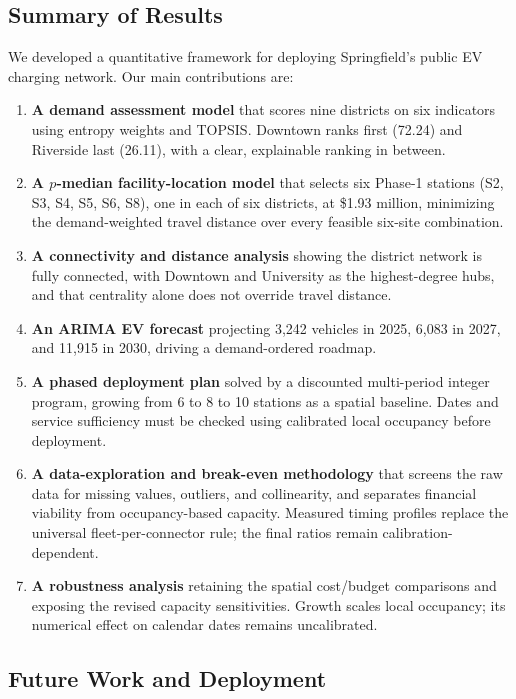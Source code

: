 \documentclass[12pt]{article}
\begin{document}
\subsection{Summary of Results}

We developed a quantitative framework for deploying Springfield's public EV charging
network. Our main contributions are:

\begin{enumerate}
    \item \textbf{A demand assessment model} that scores nine districts on six indicators
    using entropy weights and TOPSIS. Downtown ranks first (72.24) and Riverside last
    (26.11), with a clear, explainable ranking in between.
    \item \textbf{A $p$-median facility-location model} that selects six Phase-1 stations
    (S2, S3, S4, S5, S6, S8), one in each of six districts, at \$1.93 million, minimizing the
    demand-weighted travel distance over every feasible six-site combination.
    \item \textbf{A connectivity and distance analysis} showing the district network is
    fully connected, with Downtown and University as the highest-degree hubs, and that
    centrality alone does not override travel distance.
    \item \textbf{An ARIMA EV forecast} projecting 3,242 vehicles in 2025, 6,083 in 2027,
    and 11,915 in 2030, driving a demand-ordered roadmap.
    \item \textbf{A phased deployment plan} solved by a discounted multi-period integer
    program, growing from 6 to 8 to 10 stations as a spatial baseline. Dates and service
    sufficiency must be checked using calibrated local occupancy before deployment.
    \item \textbf{A data-exploration and break-even methodology} that screens the raw data
    for missing values, outliers, and collinearity, and separates financial viability
    from occupancy-based capacity. Measured timing profiles replace the universal
    fleet-per-connector rule; the final ratios remain calibration-dependent.
    \item \textbf{A robustness analysis} retaining the spatial cost/budget comparisons
    and exposing the revised capacity sensitivities. Growth scales local occupancy;
    its numerical effect on calendar dates remains uncalibrated.
\end{enumerate}

\subsection{Future Work and Deployment}
\end{document}
